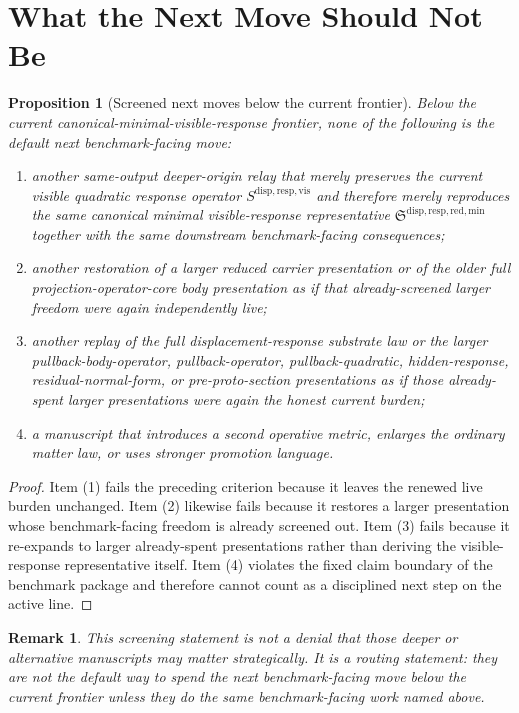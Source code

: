 \documentclass[11pt]{article}
\newcommand{\MinimalReducedStructure}{\mathfrak S^{\mathrm{disp,resp,red,min}}}
\newcommand{\VisibleResponseOperator}{S^{\mathrm{disp,resp,vis}}}
\newtheorem{proposition}{Proposition}
\newtheorem{remark}{Remark}
\begin{document}
\section{What the Next Move Should Not Be}

\begin{proposition}[Screened next moves below the current frontier]
Below the current canonical-minimal-visible-response frontier, none of the following is the default next benchmark-facing move:
\begin{enumerate}
    \item another same-output deeper-origin relay that merely preserves the current visible quadratic response operator \(\VisibleResponseOperator\) and therefore merely reproduces the same canonical minimal visible-response representative \(\MinimalReducedStructure\) together with the same downstream benchmark-facing consequences;
    \item another restoration of a larger reduced carrier presentation or of the older full projection-operator-core body presentation as if that already-screened larger freedom were again independently live;
    \item another replay of the full displacement-response substrate law or the larger pullback-body-operator, pullback-operator, pullback-quadratic, hidden-response, residual-normal-form, or pre-proto-section presentations as if those already-spent larger presentations were again the honest current burden;
    \item a manuscript that introduces a second operative metric, enlarges the ordinary matter law, or uses stronger promotion language.
\end{enumerate}
\end{proposition}

\begin{proof}
Item (1) fails the preceding criterion because it leaves the renewed live burden unchanged. Item (2) likewise fails because it restores a larger presentation whose benchmark-facing freedom is already screened out. Item (3) fails because it re-expands to larger already-spent presentations rather than deriving the visible-response representative itself. Item (4) violates the fixed claim boundary of the benchmark package and therefore cannot count as a disciplined next step on the active line.
\end{proof}

\begin{remark}
This screening statement is not a denial that those deeper or alternative manuscripts may matter strategically. It is a routing statement: they are not the default way to spend the next benchmark-facing move below the current frontier unless they do the same benchmark-facing work named above.
\end{remark}
\end{document}
